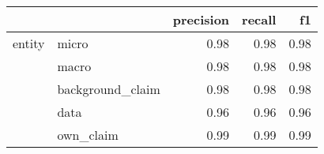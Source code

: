 \begin{tabular}{llrrr}
\toprule
       &           &  precision &  recall &   f1 \\
\midrule
entity & micro &       0.98 &    0.98 & 0.98 \\
       & macro &       0.98 &    0.98 & 0.98 \\
       & background\_claim &       0.98 &    0.98 & 0.98 \\
       & data &       0.96 &    0.96 & 0.96 \\
       & own\_claim &       0.99 &    0.99 & 0.99 \\
\bottomrule
\end{tabular}
